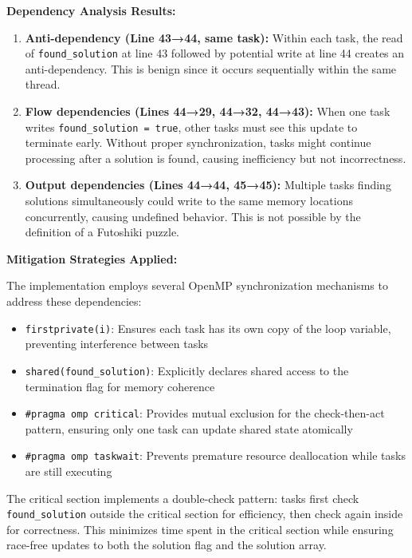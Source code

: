 \begin{enumerate}
\textbf{Dependency Analysis Results:}

\begin{enumerate}
    \item \textbf{Anti-dependency (Line 43→44, same task):} Within each task, the read of \texttt{found\_solution} at line 43 followed by potential write at line 44 creates an anti-dependency. This is benign since it occurs sequentially within the same thread.
    
    \item \textbf{Flow dependencies (Lines 44→29, 44→32, 44→43):} When one task writes \texttt{found\_solution = true}, other tasks must see this update to terminate early. Without proper synchronization, tasks might continue processing after a solution is found, causing inefficiency but not incorrectness.
    
    \item \textbf{Output dependencies (Lines 44→44, 45→45):} Multiple tasks finding solutions simultaneously could write to the same memory locations concurrently, causing undefined behavior. This is not possible by the definition of a Futoshiki puzzle.
\end{enumerate}

\textbf{Mitigation Strategies Applied:}

The implementation employs several OpenMP synchronization mechanisms to address these dependencies:

\begin{itemize}
    \item \texttt{firstprivate(i)}: Ensures each task has its own copy of the loop variable, preventing interference between tasks
    \item \texttt{shared(found\_solution)}: Explicitly declares shared access to the termination flag for memory coherence
    \item \texttt{\#pragma omp critical}: Provides mutual exclusion for the check-then-act pattern, ensuring only one task can update shared state atomically
    \item \texttt{\#pragma omp taskwait}: Prevents premature resource deallocation while tasks are still executing
\end{itemize}

The critical section implements a double-check pattern: tasks first check \texttt{found\_solution} outside the critical section for efficiency, then check again inside for correctness. This minimizes time spent in the critical section while ensuring race-free updates to both the solution flag and the solution array.


\end{enumerate}
